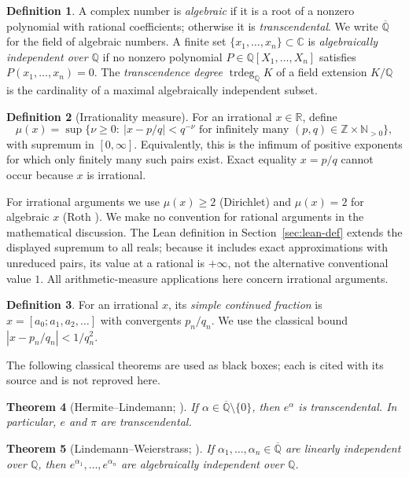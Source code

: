 \documentclass[11pt]{amsart}
\newtheorem{theorem}{Theorem}[section]
\theoremstyle{definition}
\newtheorem{definition}[theorem]{Definition}
\theoremstyle{remark}
\numberwithin{equation}{section}
\newcommand{\Q}{\mathbb{Q}}
\newcommand{\R}{\mathbb{R}}
\newcommand{\C}{\mathbb{C}}
\newcommand{\Z}{\mathbb{Z}}
\newcommand{\N}{\mathbb{N}}
\newcommand{\Qbar}{\overline{\mathbb{Q}}}
\newcommand{\trdeg}{\operatorname{trdeg}}
\newcommand{\irr}{\mu}
\newcommand{\ee}{e}
\begin{document}
\begin{definition}
A complex number is \emph{algebraic} if it is a root of a nonzero polynomial with rational coefficients; otherwise it is \emph{transcendental}. We write $\Qbar$ for the field of algebraic numbers. A finite set $\{x_1,\dots,x_n\}\subset\C$ is \emph{algebraically independent over $\Q$} if no nonzero polynomial $P\in\Q[X_1,\dots,X_n]$ satisfies $P(x_1,\dots,x_n)=0$. The \emph{transcendence degree} $\trdeg_\Q K$ of a field extension $K/\Q$ is the cardinality of a maximal algebraically independent subset.
\end{definition}

\begin{definition}[Irrationality measure]\label{def:measure}
For an irrational $x\in\R$, define
\[
\irr(x)=\sup\{\nu\ge0:\ |x-p/q|<q^{-\nu}
\text{ for infinitely many }(p,q)\in\Z\times\N_{>0}\},
\]
with supremum in $[0,\infty]$. Equivalently, this is the infimum of positive exponents for which only finitely many such pairs exist. Exact equality $x=p/q$ cannot occur because $x$ is irrational.
\end{definition}

For irrational arguments we use $\irr(x)\ge2$ (Dirichlet) and $\irr(x)=2$ for algebraic $x$ (Roth \cite{Roth1955}). We make no convention for rational arguments in the mathematical discussion. The Lean definition in Section~\ref{sec:lean-def} extends the displayed supremum to all reals; because it includes exact approximations with unreduced pairs, its value at a rational is $+\infty$, not the alternative conventional value $1$. All arithmetic-measure applications here concern irrational arguments.

\begin{definition}
For an irrational $x$, its \emph{simple continued fraction} is $x=[a_0;a_1,a_2,\dots]$ with convergents $p_n/q_n$. We use the classical bound $|x-p_n/q_n|<1/q_n^2$.
\end{definition}

The following classical theorems are used as black boxes; each is cited with its source and is not reproved here.

\begin{theorem}[Hermite--Lindemann; {\cite{Hermite1873,Lindemann1882}}]\label{thm:HL}
If $\alpha\in\Qbar\setminus\{0\}$, then $\ee^\alpha$ is transcendental. In particular, $\ee$ and $\pi$ are transcendental.
\end{theorem}

\begin{theorem}[Lindemann--Weierstrass; {\cite{Lindemann1882}}]\label{thm:LW}
If $\alpha_1,\dots,\alpha_n\in\Qbar$ are linearly independent over $\Q$, then $\ee^{\alpha_1},\dots,\ee^{\alpha_n}$ are algebraically independent over $\Q$.
\end{theorem}
\end{document}
